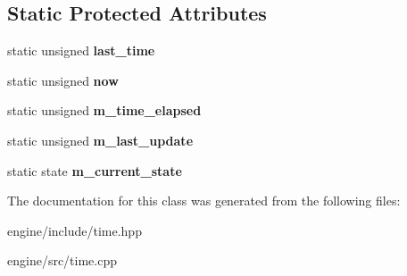\subsection*{Static Protected Attributes}
\begin{DoxyCompactItemize}
\item 
static unsigned {\bfseries last\+\_\+time}\hypertarget{classengine_1_1_time_ad5e9097bf789426ce7b6e2fba3f5e8f7}{}\label{classengine_1_1_time_ad5e9097bf789426ce7b6e2fba3f5e8f7}

\item 
static unsigned {\bfseries now}\hypertarget{classengine_1_1_time_a01cef2b4e329a65898dee12716686a8c}{}\label{classengine_1_1_time_a01cef2b4e329a65898dee12716686a8c}

\item 
static unsigned {\bfseries m\+\_\+time\+\_\+elapsed}\hypertarget{classengine_1_1_time_a6dc7fc5e4896964c6b798deca46dde2c}{}\label{classengine_1_1_time_a6dc7fc5e4896964c6b798deca46dde2c}

\item 
static unsigned {\bfseries m\+\_\+last\+\_\+update}\hypertarget{classengine_1_1_time_a3203e2a51bcdb4e81d67cbbee4537b3a}{}\label{classengine_1_1_time_a3203e2a51bcdb4e81d67cbbee4537b3a}

\item 
static state {\bfseries m\+\_\+current\+\_\+state}\hypertarget{classengine_1_1_time_adf969e39b1e152ce7e58b070f87476f9}{}\label{classengine_1_1_time_adf969e39b1e152ce7e58b070f87476f9}

\end{DoxyCompactItemize}


The documentation for this class was generated from the following files\+:\begin{DoxyCompactItemize}
\item 
engine/include/time.\+hpp\item 
engine/src/time.\+cpp\end{DoxyCompactItemize}
